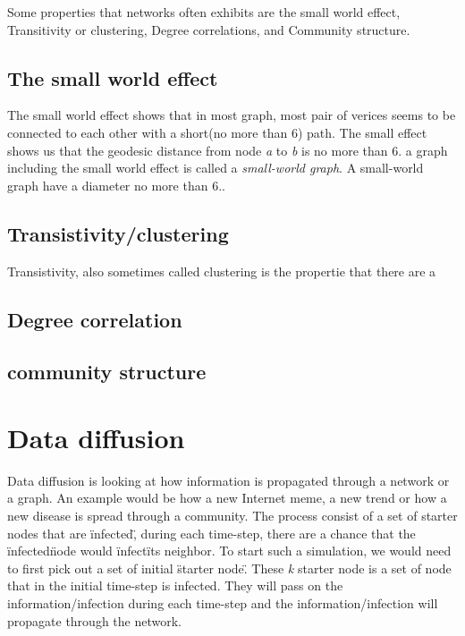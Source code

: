 Some properties that networks often exhibits are the small world effect, Transitivity or clustering, Degree correlations, and Community structure\cite{ComplexNetwork2003}.

\subsection{The small world effect}
The small world effect shows that in most graph, most pair of verices seems to be connected to each other with a short(no more than 6) path\cite{ComplexNetwork2003}. The small effect shows us that the geodesic distance from node {\it a} to {\it b} is no more than 6. a graph including the small world effect is called a {\it small-world graph}. A small-world graph have a diameter no more than 6.. 

\subsection{Transistivity/clustering}
Transistivity, also sometimes called clustering is the propertie that there are a 

\subsection{Degree correlation}

\subsection{community structure}



\section{Data diffusion}
Data diffusion is looking at how information is propagated through a network or a graph. An example would be how a new Internet meme, a new trend or how a new disease is spread through a community. The process consist of a set of starter nodes that are \"infected\", during each time-step, there are a chance that the \"infected\" node would \"infect\" its neighbor. To start such a simulation, we would need to first pick out a set of initial \"starter node\". These {\it k} starter node is a set of node that in the initial time-step is infected. They will pass on the information/infection during each time-step and the information/infection will propagate through the network.

